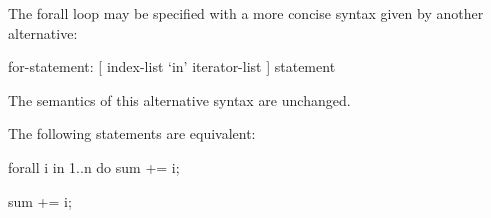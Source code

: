 The forall loop may be specified with a more concise syntax given by
another alternative:
\begin{syntax}
for-statement:
  [ index-list `in' iterator-list ] statement
\end{syntax}
The semantics of this alternative syntax are unchanged.

\begin{example}
The following statements are equivalent:
\begin{chapel}
forall i in 1..n do
  sum += i;
\end{chapel}
\begin{chapel}
[i in 1..n] sum += i;
\end{chapel}
\end{example}
